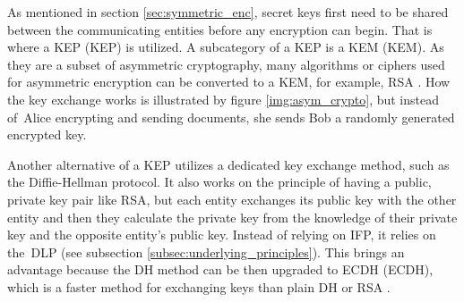 As mentioned in section \ref{sec:symmetric_enc}, secret keys first need to be shared between the communicating entities before any encryption can begin. That is where a KEP (\acl{KEP}) is utilized. A subcategory of a KEP is a KEM (\acl{KEM}). As they are a subset of asymmetric cryptography, many algorithms or ciphers used for asymmetric encryption can be converted to a KEM, for example, RSA \cite{Ristic2014}. How the key exchange works is illustrated by figure \ref{img:asym_crypto}, but instead of~Alice encrypting and sending documents, she sends Bob a randomly generated encrypted key.

Another alternative of a KEP utilizes a dedicated key exchange method, such as the Diffie-Hellman protocol. It also works on the principle of having a public, private key pair like RSA, but each entity exchanges its public key with the other entity and then they calculate the private key from the knowledge of their private key and the opposite entity's public key. Instead of relying on IFP, it relies on the~DLP (see subsection \ref{subsec:underlying_principles}). This brings an advantage because the DH method can be then upgraded to \acl{ECDH} (ECDH), which is a faster method for exchanging keys than plain DH or RSA \cite{Ristic2014}.

